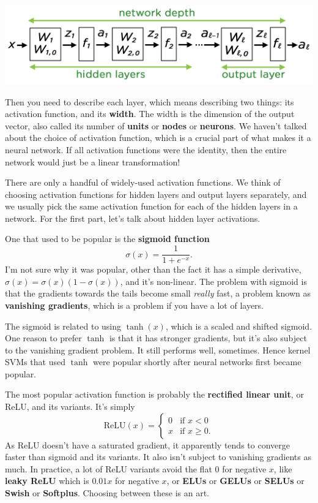 \documentclass[11pt,paper=letter]{scrartcl}
\begin{document}
\begin{center}
  \includegraphics[width=\textwidth]{29.png}
\end{center}

Then you need to describe each layer, which means describing two things: its activation function, and its \textbf{width}. The width is the dimension of the output vector, also called its number of \textbf{units} or \textbf{nodes} or \textbf{neurons}. We haven't talked about the choice of activation function, which is a crucial part of what makes it a neural network. If all activation functions were the identity, then the entire network would just be a linear transformation!

There are only a handful of widely-used activation functions. We think of choosing activation functions for hidden layers and output layers separately, and we usually pick the same activation function for each of the hidden layers in a network. For the first part, let's talk about hidden layer activations.

One that used to be popular is the \textbf{sigmoid function}\[
  \sigma(x) = \frac{1}{1 + e^{-x}}.
\]
I'm not sure why it was popular, other than the fact it has a simple derivative, $\sigma(x) = \sigma(x)\left(1 - \sigma(x)\right)$, and it's non-linear. The problem with sigmoid is that the gradients towards the tails become small \textit{really} fast, a problem known as \textbf{vanishing gradients}, which is a problem if you have a lot of layers.

The sigmoid is related to using $\tanh(x)$, which is a scaled and shifted sigmoid. One reason to prefer $\tanh$ is that it has stronger gradients, but it's also subject to the vanishing gradient problem. It still performs well, sometimes. Hence kernel SVMs that used $\tanh$ were popular shortly after neural networks first became popular.

The most popular activation function is probably the \textbf{rectified linear unit}, or ReLU, and its variants. It's simply \[
  \text{ReLU}(x) = \begin{cases}
  0 & \text{if } x < 0 \\
  x & \text{if } x \ge 0.
  \end{cases}
\]
As ReLU doesn't have a saturated gradient, it apparently tends to converge faster than sigmoid and its variants. It also isn't subject to vanishing gradients as much. In practice, a lot of ReLU variants avoid the flat $0$ for negative $x$, like \textbf{leaky ReLU} which is $0.01x$ for negative $x$, or \textbf{ELUs} or \textbf{GELUs} or \textbf{SELUs} or \textbf{Swish} or \textbf{Softplus}. Choosing between these is an art.
\end{document}
